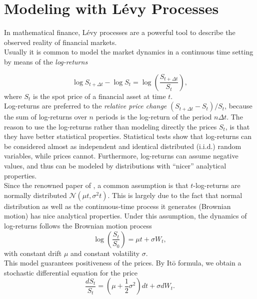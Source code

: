 

\chapter{Modeling with Lévy Processes}\label{Chapter1}
\minitoc%


\vspace{5em}

In mathematical finance, Lévy processes are a powerful tool to describe the observed reality of financial markets.\\ 
Usually it is common to model the market dynamics in a continuous time setting by means of the \emph{log-returns}

\begin{equation}
 \log S_{t+\Delta t} - \log S_t = \log \left(\frac{S_{t+\Delta t}}{S_t}\right),
\end{equation}
where $S_t$ is the spot price of a financial asset at time $t$.\\
Log-returns are preferred to the \emph{relative price change} $(S_{t+\Delta t} - S_t )/S_t$, because the sum of log-returns 
over $n$ periods is the log-return of the period $n \Delta t$.
The reason to use the log-returns rather than modeling directly the prices $S_t$, is that they have better statistical properties.
Statistical tests show that log-returns can be considered almost as independent and identical distributed (i.i.d.) 
random variables, while prices cannot. Furthermore, log-returns can assume negative values, and thus can be modeled by distributions
with ``nicer'' analytical properties.\\
Since the renowned paper of \cite{BS73}, a common assumption is that $t$-log-returns are 
normally distributed $\mathcal{N}(\mu t,\sigma^2 t)$. 
This is largely due to the fact that normal distribution as well as the continuous-time process
it generates (Brownian motion) has nice analytical properties.
Under this assumption, the dynamics  of log-returns follows the Brownian motion process
\begin{equation}\label{GBM}
 \log \left( \frac{S_t}{S_0} \right) = \mu t + \sigma W_t ,
\end{equation}
with constant drift $\mu$ and constant volatility $\sigma$.\\
This model guarantees positiveness of the prices. By It\={o} formula, we obtain a stochastic differential equation for the price
\begin{equation}\label{GBM_sde}
 \frac{d S_t}{S_t} = (\mu + \frac{1}{2} \sigma^2) d t + \sigma dW_t  .
\end{equation}
